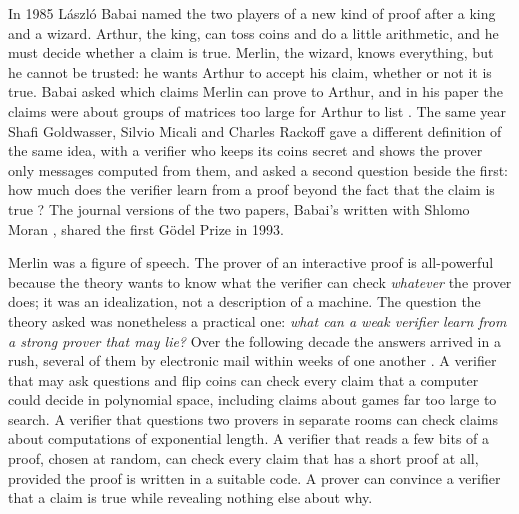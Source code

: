 \label{ch:prologue}
\begin{refsection}

In 1985 László Babai named the two players of a new kind of proof after a king and a wizard. Arthur, the king, can toss coins and do a little arithmetic, and he must decide whether a claim is true. Merlin, the wizard, knows everything, but he cannot be trusted: he wants Arthur to accept his claim, whether or not it is true. Babai asked which claims Merlin can prove to Arthur, and in his paper the claims were about groups of matrices too large for Arthur to list \parencite{Babai1985}. The same year Shafi Goldwasser, Silvio Micali and Charles Rackoff gave a different definition of the same idea, with a verifier who keeps its coins secret and shows the prover only messages computed from them, and asked a second question beside the first: how much does the verifier learn from a proof beyond the fact that the claim is true \parencite{GoldwasserMicaliRackoff1989}? The journal versions of the two papers, Babai's written with Shlomo Moran \parencite{BabaiMoran1988}, shared the first Gödel Prize in 1993.

Merlin was a figure of speech. The prover of an interactive proof is all-powerful because the theory wants to know what the verifier can check \emph{whatever} the prover does; it was an idealization, not a description of a machine. The question the theory asked was nonetheless a practical one: \emph{what can a weak verifier learn from a strong prover that may lie?} Over the following decade the answers arrived in a rush, several of them by electronic mail within weeks of one another \parencite{Babai1990}. A verifier that may ask questions and flip coins can check every claim that a computer could decide in polynomial space, including claims about games far too large to search. A verifier that questions two provers in separate rooms can check claims about computations of exponential length. A verifier that reads a few bits of a proof, chosen at random, can check every claim that has a short proof at all, provided the proof is written in a suitable code. A prover can convince a verifier that a claim is true while revealing nothing else about why.


\end{refsection}
